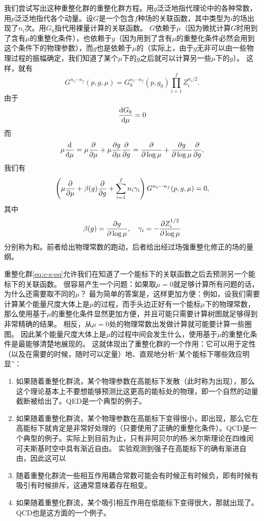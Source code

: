 我们尝试写出这种重整化群的重整化群方程。用$g$泛泛地指代理论中的各种常数，用$p$泛泛地指代各个动量。设$G$是一个包含$f$种场的关联函数，其中类型为$i$的场出现了$n_i$次。用$G_0$指代用裸量计算的关联函数。
$G$依赖于$\mu$（因为微扰计算$G$时用到了含有$\mu$的重整化条件），也依赖于$g$（因为用到了含有$\mu$的重整化条件必然会用到这个条件下的物理参数），而$g$也是依赖于$\mu$的（实际上，由于$g$无非可以由一些物理过程的振幅确定，我们知道了某个$\mu$下的$g$之后就可以计算另一些$\mu$下的$g$）。
这样，就有
\[
    G^{n_1 \cdots n_f}(p, g, \mu) = G_0^{n_1 \cdots n_f}(p, g_0) \prod_{i=1}^f Z_i^{n_i / 2}.
\]
由于
\[
    \dv{G_0}{\mu} = 0
\]
而
\begin{equation}
    \mu \dv{\mu} = \mu \pdv{\mu} + \mu \pdv{g}{\mu} \pdv{g} = \pdv{\log \mu} + \pdv{g}{\log \mu} \pdv{g},
\end{equation}
我们有
\begin{equation}
    \left( \mu \pdv{\mu} + \beta(g) \pdv{g} + \sum_{i=1}^f n_i \gamma_i \right) G^{n_1 \cdots n_f}(p, g, \mu) = 0,
    \label{eq:c-s-eq}
\end{equation}
其中
\begin{equation}
    \beta(g) = \pdv{g}{\log \mu}, \quad \gamma_i = - \pdv{Z_i^{1/2}}{\log \mu}
\end{equation}
分别称为和。前者给出物理常数的跑动，后者给出经过场强重整化修正的场的量纲。

重整化群\eqref{eq:c-s-eq}允许我们在知道了一个能标下的关联函数之后去预测另一个能标下的关联函数。
很容易产生一个问题：如果取$\mu=0$就足够计算所有问题的话，为什么还需要取不同的$\mu$？
最为简单的答案是，这样更加方便：例如，设我们需要计算某个能量尺度大体上是$\mu$的过程，而手头边正好有一个能标$\mu$下的物理常数，那么使用基于$\mu$的重整化条件显然更加方便，并且可能只需要计算树图就足够得到非常精确的结果。
相反，从$\mu=0$处的物理常数出发做计算就可能要计算一些圈图。
因此某个能量尺度大体上是$\mu$的过程中间会发生什么，使用基于$\mu$的重整化条件是最能够清楚地展现的。
这就体现出了重整化群的一个作用：它可以用于定性（以及在需要的时候，随时可以定量）地、直观地分析“某个能标下哪些效应明显”：
\begin{enumerate}
    \item 如果随着重整化群流，某个物理参数在高能标下发散（此时称为出现），那么这个理论基本上不要想能够预测比这更高的能标处的物理，即一个自然的动量截断被给出了。QED是一个典型的例子。
    \item 如果随着重整化群流，某个物理参数在高能标下变得很小，即出现，那么它在高能标下就肯定是非常好处理的（只要使用了正确的重整化条件）。QCD是一个典型的例子。实际上到目前为止，只有非阿贝尔的杨-米尔斯理论在四维闵可夫斯基时空中具有渐近自由。
    实验观测到强子在高能标下的确有渐进自由，因此这可以
    \item 随着重整化群流一些相互作用耦合常数可能会有时候正有时候负，即有时候有吸引有时候排斥，这通常意味着存在相变。
    \item 如果随着重整化群流，某个吸引相互作用在低能标下变得很大，那就出现了。QCD也是这方面的一个例子。
\end{enumerate}

